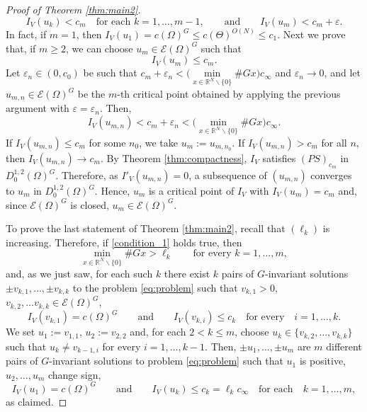 \documentclass[10pt,letterpaper]{article}
\numberwithin{equation}{section}
\def\rn{\mathbb{R}^N}
\def\eps{\varepsilon}
\def\o{\Omega}
\def\cE{\mathcal{E}}
\begin{document}
\begin{proof}[Proof of Theorem \ref{thm:main2}]
\begin{equation*}
   I_V(u_k) < c_m \quad \text{for each \ } k=1, \ldots, m-1,\qquad\text{and}\qquad I_V(u_m) < c_m+\eps. 
\end{equation*}
In fact, if $m=1$, then $I_V(u_1)=c(\o)^G\leq c(\Theta)^{O(N)}\leq c_1$. Next we prove that, if $m\geq 2$, we can choose $u_m\in\cE(\Omega)^G$ such that
\begin{equation*}
 I_V(u_m) \leq c_m . 
\end{equation*}
Let $\varepsilon_n \in (0,c_0)$ be such that $c_m + \varepsilon_n < \Big(\min\limits_{x\in\rn\smallsetminus\{0\}}\# Gx\Big) c_{\infty} $ and $\varepsilon_n \rightarrow 0$, and let $u_{m,n}\in\cE(\Omega)^G$ be the $m$-th critical point obtained by applying the previous argument with $\varepsilon = \varepsilon_n$. Then, 
$$I_V(u_{m,n}) < c_m + \varepsilon_n< \Big(\min_{x\in\rn\smallsetminus\{0\}}\# Gx\Big) c_{\infty}.$$
If $I_V(u_{m,n}) \leq c_m$ for some $n_0$, we take $u_m:=u_{m,n_0}$. If $I_V(u_{m,n})>c_m$ for all $n$, then $I_V(u_{m,n}) \rightarrow c_m$. By Theorem \ref{thm:compactness}, $I_V$ satisfies $(PS)_{c_m}$ in $D^{1,2}_0(\Omega)^G$. Therefore, as $I'_V(u_{m,n}) =0$, a subsequence of $(u_{m,n})$ converges to $u_m$ in $D^{1,2}_0(\Omega)^G$. Hence, $u_m$ is a critical point of $I_V$ with $I_V(u_m) = c_m$ and, since $\cE(\Omega)^G$ is closed, $u_m\in\cE(\Omega)^G$.

To prove the last statement of Theorem \ref{thm:main2}, recall that $(\ell_k)$ is increasing. Therefore, if \eqref{condition_1} holds true, then
$$\min_{x\in\rn\smallsetminus\{0\}}\# Gx > \ell_k\qquad\text{for every \ }k = 1,\ldots,m,$$
and, as we just saw, for each such $k$ there exist $k$ pairs of $G$-invariant solutions $\pm v_{k,1}, \ldots , \pm v_{k,k}$ to the problem \eqref{eq:problem} such that $v_{k,1}>0$, $v_{k,2}, \ldots v_{k,k}\in\cE(\o)^G$, 
\[
I_V(v_{k,1})=c(\o)^G\qquad\text{and}\qquad I_V(v_{k,i}) \leq c_k \quad \text{for every} \quad i= 1,\ldots,k.
\]
We set $u_1 := v_{1,1}$, $u_2 := v_{2,2}$ and, for each $2<k\leq m$, choose $u_k \in \{v_{k,2},\ldots,v_{k,k}\}$ such that $u_k \neq v_{k-1,i}$ for every $i=1, \ldots, k-1$. Then, $\pm u_1, \ldots, \pm u_m$ are $m$ different pairs of $G$-invariant solutions to problem \eqref{eq:problem} such that $u_1$ is positive, $u_2, \ldots , u_m$ change sign, 
\[
I_V(u_1)=c(\o)^G\qquad\text{and}\qquad I_{V}(u_k) \leq c_k=\ell_kc_\infty \quad \text{for each} \quad k = 1, \ldots, m,
\]
as claimed.
\end{proof}
	
\end{document}
